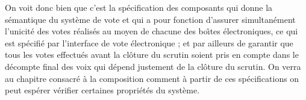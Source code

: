 On voit donc bien que c'est la sp\'ecification des composants qui
donne la s\'emantique du syst\`eme de vote et qui a pour fonction
d'assurer simultan\'ement l'unicit\'e des votes r\'ealis\'es au
moyen de chacune des bo\^{\i}tes \'electroniques, ce qui est
sp\'ecifi\'e par l'interface de vote \'electronique ; et par
ailleurs de garantir que tous les votes effectu\'es avant la
cl\^oture du scrutin soient pris en compte dans le d\'ecompte final
des voix qui d\'epend justement de la cl\^oture du scrutin. 
On verra  au chapitre consacr\'e \`a la composition
comment \`a partir de ces sp\'ecifications on peut esp\'erer
v\'erifier certaines propri\'et\'es du syst\`eme.



%
%
%
%
%
%
%
%
%
%

